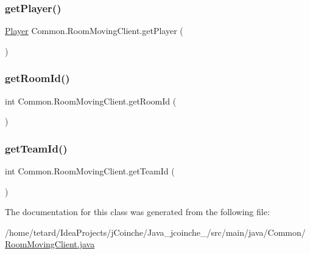 \subsubsection{\texorpdfstring{get\+Player()}{getPlayer()}}
{\footnotesize\ttfamily \mbox{\hyperlink{classCommon_1_1Player}{Player}} Common.\+Room\+Moving\+Client.\+get\+Player (\begin{DoxyParamCaption}{ }\end{DoxyParamCaption})\hspace{0.3cm}{\ttfamily [inline]}}

\mbox{\label{classCommon_1_1RoomMovingClient_a81d463606183e832672ec00b25c07088}} 
\subsubsection{\texorpdfstring{get\+Room\+Id()}{getRoomId()}}
{\footnotesize\ttfamily int Common.\+Room\+Moving\+Client.\+get\+Room\+Id (\begin{DoxyParamCaption}{ }\end{DoxyParamCaption})\hspace{0.3cm}{\ttfamily [inline]}}

\mbox{\label{classCommon_1_1RoomMovingClient_afdc28b796ecc99d62049c98fb53cef72}} 
\subsubsection{\texorpdfstring{get\+Team\+Id()}{getTeamId()}}
{\footnotesize\ttfamily int Common.\+Room\+Moving\+Client.\+get\+Team\+Id (\begin{DoxyParamCaption}{ }\end{DoxyParamCaption})\hspace{0.3cm}{\ttfamily [inline]}}



The documentation for this class was generated from the following file\+:\begin{DoxyCompactItemize}
\item 
/home/tetard/\+Idea\+Projects/j\+Coinche/\+Java\+\_\+jcoinche\+\_/src/main/java/\+Common/\mbox{\hyperlink{RoomMovingClient_8java}{Room\+Moving\+Client.\+java}}\end{DoxyCompactItemize}
